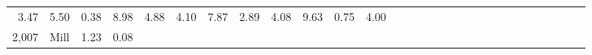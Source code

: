 \documentclass[]{article}
\begin{document}
\begin{longtable}[]{@{}rlrrrrrrrrrrrrrrrrrrrrrrrrrrr@{}}
\begin{minipage}[t]{0.01\columnwidth}
3.47\strut
\end{minipage} & \begin{minipage}[t]{0.01\columnwidth}\raggedleft\strut
5.50\strut
\end{minipage} & \begin{minipage}[t]{0.02\columnwidth}\raggedleft\strut
0.38\strut
\end{minipage} & \begin{minipage}[t]{0.02\columnwidth}\raggedleft\strut
8.98\strut
\end{minipage} & \begin{minipage}[t]{0.01\columnwidth}\raggedleft\strut
4.88\strut
\end{minipage} & \begin{minipage}[t]{0.01\columnwidth}\raggedleft\strut
4.10\strut
\end{minipage} & \begin{minipage}[t]{0.01\columnwidth}\raggedleft\strut
7.87\strut
\end{minipage} & \begin{minipage}[t]{0.02\columnwidth}\raggedleft\strut
2.89\strut
\end{minipage} & \begin{minipage}[t]{0.01\columnwidth}\raggedleft\strut
4.08\strut
\end{minipage} & \begin{minipage}[t]{0.01\columnwidth}\raggedleft\strut
9.63\strut
\end{minipage} & \begin{minipage}[t]{0.01\columnwidth}\raggedleft\strut
0.75\strut
\end{minipage} & \begin{minipage}[t]{0.01\columnwidth}\raggedleft\strut
4.00\strut
\end{minipage}\tabularnewline
\begin{minipage}[t]{0.01\columnwidth}\raggedleft\strut
2,007\strut
\end{minipage} & \begin{minipage}[t]{0.02\columnwidth}\raggedright\strut
Mill\strut
\end{minipage} & \begin{minipage}[t]{0.01\columnwidth}\raggedleft\strut
1.23\strut
\end{minipage} & \begin{minipage}[t]{0.02\columnwidth}\raggedleft\strut
0.08\strut
\end{minipage} & \begin{minipage}[t]{0.02\columnwidth}\raggedleft\strut

\end{minipage}
\end{longtable}
\end{document}
